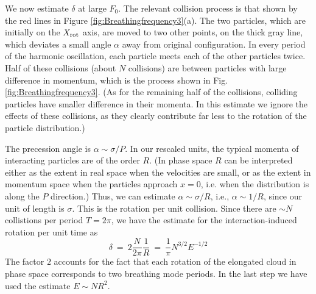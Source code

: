 \documentclass[a4paper, onecolumn]{revtex4-1}
\begin{document}
We now estimate $\delta$ at large $F_0$.  The relevant collision process is that shown by the red
lines in Figure \ref{fig:Breathingfrequency3}(a).  The two particles, which are initially on the
$X_{\rm rot}$ axis, are moved to two other points, on the thick gray line, which deviates a small
angle $\alpha$ away from original configuration.  In every period of the harmonic oscillation, each
particle meets each of the other particles twice.  Half of these collisions (about $N$ collisions)
are between particles with large difference in momentum, which is the process shown in
Fig.\ref{fig:Breathingfrequency3}.  (As for the remaining half of the collisions, colliding
particles have smaller difference in their momenta.  In this estimate we ignore the effects of these
collisions, as they clearly contribute far less to the rotation of the particle distribution.)

The precession angle is $\alpha\sim \sigma/P$.  In our rescaled units, the typical momenta of
interacting particles are of the order $R$.  (In phase space $R$ can be interpreted either as the
extent in real space when the velocities are small, or as the extent in momentum space when the
particles approach $x=0$, i.e. when the distribution is along the $P$ direction.)  Thus, we can
estimate $\alpha\sim \sigma/R$, i.e., $\alpha\sim 1/R$, since our unit of length is $\sigma$.  This
is the rotation per unit collision.  Since there are $\sim N$ collistions per period $T=2\pi$, we
have the estimate for the interaction-induced rotation per unit time as
\begin{equation}
\delta ~=~ 2 \frac{N}{2\pi} \frac{1}{R} ~=~  \frac{1}{\pi}  N^{3/2}E^{-1/2}
\label{eq:breathingfrequency1}
\end{equation}
The factor $2$ accounts for the fact that each rotation of the elongated cloud in phase space
corresponds to two breathing mode periods.  In the last step we have used the estimate $E\sim
NR^2$. 
\end{document}
